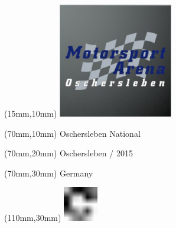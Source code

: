 \null\newpage
\begin{textblock*}{50mm}(15mm,10mm)%
\includegraphics[width=50mm]{LG/2015-05-20_00090.png}
\end{textblock*}
\begin{textblock*}{130mm}(70mm,10mm)%
{\fontsize{20}{20}\selectfont Oschersleben National}\\
\end{textblock*}
\begin{textblock*}{120mm}(70mm,20mm)%
{\fontsize{16}{16}\selectfont Oschersleben / 2015}\\
\end{textblock*}
\begin{textblock*}{120mm}(70mm,30mm)%
{\fontsize{12}{12}\selectfont Germany}
\end{textblock*}
\begin{textblock*}{30mm}(110mm,30mm)%
\centering
\includegraphics[height=15mm]{icons/fa-rotate-right.pdf}
\end{textblock*}
